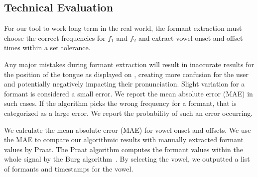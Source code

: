 
\subsection{Technical Evaluation}
For our tool to work long term in the real world, the formant extraction must choose the correct frequencies for $f_1$ and $f_2$ and extract vowel onset and offset times within a set tolerance. 

Any major mistakes during formant extraction will result in inaccurate results for the position of the tongue as displayed on \visowel{}, creating more confusion for the user and potentially negatively impacting their pronunciation. Slight variation for a formant is considered a small error. We report the mean absolute error (MAE) in such cases. If the algorithm picks the wrong frequency for a formant, that is categorized as a large error. We report the probability of such an error occurring. 


We calculate the mean absolute error (MAE) for vowel onset and offsets. We use the MAE to compare our algorithmic results with manually extracted formant values by Praat. The Praat algorithm computes the formant values within the whole signal by the Burg algorithm~\cite{hugoQuenePraat}. By selecting the vowel, we outputted a list of formants and timestamps for the vowel.

